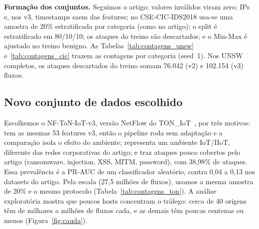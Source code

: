 \documentclass[conference]{IEEEtran}
\begin{document}
\begin{table}[!t]
\centering
\caption{Datasets completos e fração estratificada usada nos experimentos.}
\label{tab:datasets}
\footnotesize
\setlength{\tabcolsep}{4pt}

\end{table}

\textbf{Formação dos conjuntos.} Seguimos o artigo: valores inválidos viram
zero; IPs e, nos v3, timestamps saem das features; no CSE-CIC-IDS2018 usa-se uma
amostra de 20\% estratificada por categoria (como no artigo); o split é
estratificado em 80/10/10; os ataques do treino são descartados; e o Min-Max é
ajustado no treino benigno. As Tabelas~\ref{tab:contagens_unsw}
e~\ref{tab:contagens_cic} trazem as contagens por categoria (seed~1). Nos UNSW
completos, os ataques descartados do treino somam 76.042 (v2) e 102.154 (v3)
fluxos.

\begin{table}[!t]
\centering
\caption{Desempenho no teste (média $\pm$ desvio entre seeds). As linhas acima da nossa são da Tabela 3 de Guerra \emph{et al.}~\cite{guerra2025graphids}.}
\label{tab:reproducao}
\footnotesize

\end{table}

\begin{table}[!t]
\centering
\caption{Fluxos por categoria e partição nos datasets NF-UNSW-NB15 (seed 1). O treino só tem benignos.}
\label{tab:contagens_unsw}
\footnotesize

\end{table}

\begin{table}[!t]
\centering
\caption{Fluxos por categoria e partição nos datasets NF-CSE-CIC-IDS2018, após a amostra de 20\% (seed 1).}
\label{tab:contagens_cic}
\footnotesize

\end{table}

\subsection{Novo conjunto de dados escolhido}

Escolhemos o NF-ToN-IoT-v3, versão NetFlow do TON\_IoT~\cite{moustafa2021toniot},
por três motivos: tem as mesmas 53 features v3, então o pipeline roda sem
adaptação e a comparação isola o efeito do ambiente; representa um ambiente
IoT/IIoT, diferente das redes corporativas do artigo; e traz ataques pouco
cobertos pelo artigo (ransomware, injection, XSS, MITM, password), com 38,98\%
de ataques. Essa prevalência é a PR-AUC de um classificador aleatório, contra
0,04 a 0,13 nos datasets do artigo. Pela escala (27,5 milhões de fluxos), usamos
a mesma amostra de 20\% e o mesmo protocolo (Tabela~\ref{tab:contagens_ton}).
A análise exploratória mostra que poucos hosts concentram o tráfego: cerca de 40
origens têm de milhares a milhões de fluxos cada, e as demais têm poucas centenas
ou menos (Figura~\ref{fig:cauda}).
\end{document}
